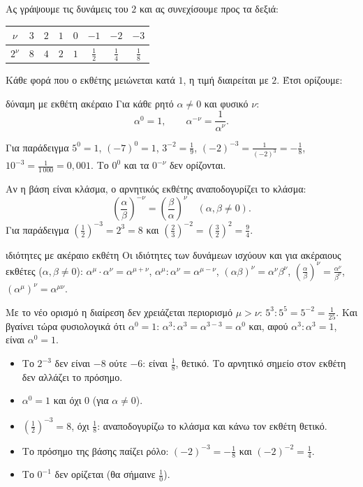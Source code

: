 Ας γράψουμε τις δυνάμεις του $2$ και ας συνεχίσουμε προς τα δεξιά:
\begin{center}
\renewcommand{\arraystretch}{1.3}
\begin{tabular}{c|ccccccc}
$\nu$ & $3$ & $2$ & $1$ & $0$ & $-1$ & $-2$ & $-3$\\\hline
$2^\nu$ & $8$ & $4$ & $2$ & $1$ & $\frac{1}{2}$ & $\frac{1}{4}$ & $\frac{1}{8}$
\end{tabular}
\end{center}
Κάθε φορά που ο εκθέτης μειώνεται κατά $1$, η τιμή διαιρείται με $2$. Έτσι ορίζουμε:

\begin{orismos}{δύναμη με εκθέτη ακέραιο}
Για κάθε ρητό $\alpha\neq0$ και φυσικό $\nu$:
$$\alpha^0=1,\qquad \alpha^{-\nu}=\dfrac{1}{\alpha^{\nu}}.$$
\end{orismos}

Για παράδειγμα $5^0=1$, $(-7)^0=1$, $3^{-2}=\frac{1}{9}$, $(-2)^{-3}=\frac{1}{(-2)^3}=-\frac{1}{8}$, $10^{-3}=\frac{1}{1\,000}=0{,}001$. Το $0^0$ και τα $0^{-\nu}$ δεν ορίζονται.


Αν η βάση είναι κλάσμα, ο αρνητικός εκθέτης αναποδογυρίζει το κλάσμα:
$$\left(\dfrac{\alpha}{\beta}\right)^{-\nu}=\left(\dfrac{\beta}{\alpha}\right)^{\nu}\quad(\alpha,\beta\neq0).$$
Για παράδειγμα $\left(\frac{1}{2}\right)^{-3}=2^3=8$ και $\left(\frac{2}{3}\right)^{-2}=\left(\frac{3}{2}\right)^2=\frac{9}{4}$.

\begin{idiotita}{ιδιότητες με ακέραιο εκθέτη}
Οι ιδιότητες των δυνάμεων ισχύουν και για ακέραιους εκθέτες ($\alpha,\beta\neq0$): $\alpha^\mu\cdot\alpha^\nu=\alpha^{\mu+\nu}$, $\alpha^\mu:\alpha^\nu=\alpha^{\mu-\nu}$, $(\alpha\beta)^\nu=\alpha^\nu\beta^\nu$, $\left(\frac{\alpha}{\beta}\right)^\nu=\frac{\alpha^\nu}{\beta^\nu}$, $(\alpha^\mu)^\nu=\alpha^{\mu\nu}$.
\end{idiotita}

Με το νέο ορισμό η διαίρεση δεν χρειάζεται περιορισμό $\mu>\nu$: $5^3:5^5=5^{-2}=\frac{1}{25}$. Και βγαίνει τώρα φυσιολογικά ότι $\alpha^0=1$: $\alpha^3:\alpha^3=\alpha^{3-3}=\alpha^0$ και, αφού $\alpha^3:\alpha^3=1$, είναι $\alpha^0=1$.

\begin{prosoxi}
\begin{itemize}[leftmargin=1.2em,itemsep=0.3ex,topsep=2pt]
\item Το $2^{-3}$ δεν είναι $-8$ ούτε $-6$: είναι $\frac{1}{8}$, θετικό. Το αρνητικό σημείο στον εκθέτη δεν αλλάζει το πρόσημο.
\item $\alpha^0=1$ και όχι $0$ (για $\alpha\neq0$).
\item $\left(\frac{1}{2}\right)^{-3}=8$, όχι $\frac{1}{8}$: αναποδογυρίζω το κλάσμα και κάνω τον εκθέτη θετικό.
\item Το πρόσημο της βάσης παίζει ρόλο: $(-2)^{-3}=-\frac{1}{8}$ και $(-2)^{-2}=\frac{1}{4}$.
\item Το $0^{-1}$ δεν ορίζεται (θα σήμαινε $\frac{1}{0}$).
\end{itemize}
\end{prosoxi}

